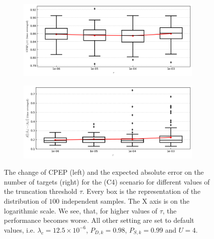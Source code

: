\begin{figure}
    \centering
    \begin{subfigure}[]{0.48\linewidth}
        \centering
        \includegraphics[width=\linewidth]{figures/c4-tau-cpep.png}
    \end{subfigure}
    \hfill
    \begin{subfigure}[]{0.48\linewidth}
        \centering
        \includegraphics[width=\linewidth]{figures/c4-tau-eae.png}
    \end{subfigure}
  \caption[(C4). Change of performance depending on the prune threshold.]{The change of CPEP (left) and the expected absolute error on the number of targets (right) for the (C4) scenario for different values of the truncation threshold $\tau$. Every box is the representation of the distribution of $100$ independent samples. The X axis is on the logarithmic scale. We see, that, for higher values of $\tau$, the performance becomes worse. All other setting are set to default values, i.e. $\lambda_{c} = 12.5 \times 10^{-6}$, $P_{D,k} = 0.98$, $P_{S,k} = 0.99$ and $U = 4$.}
  \label{fig:c4-tau}
\end{figure}


